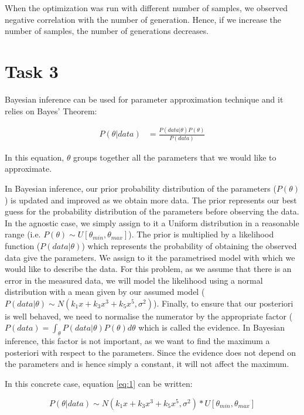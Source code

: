 \documentclass{article}
\begin{document}
    When the optimization was run with different number of samples, we observed negative correlation with the number of generation. Hence, if we increase the number of samples, the number of generations decreases.

    \section{Task 3}
    Bayesian inference can be used for parameter approximation technique and it relies on Bayes' Theorem:
        
    \begin{align}
        P(\theta | data) &= \frac{P(data | \theta) P(\theta)}{P(data)}
        \label{eq:1}
    \end{align}

    In this equation, $\theta$ groups together all the parameters that we would like to approximate.

    In Bayesian inference, our prior probability distribution of the parameters ($P(\theta)$) is updated and improved as we obtain more data.
    The prior represents our best guess for the probability distribution of the parameters before observing the data.
    In the agnostic case, we simply assign to it a Uniform distribution in a reasonable range (i.e. $P(\theta) \sim U[\theta_{min}, \theta_{max}]$).
    The prior is multiplied by a likelihood function ($P(data|\theta)$) which represents the probability of obtaining the observed data give the parameters.
    We assign to it the parametrised model with which we would like to describe the data. 
    For this problem, as we assume that there is an error in the measured data, we will model the likelihood using a normal distribution with a mean given by our assumed model ($P(data | \theta) \sim N(k_1 x + k_3 x^3 + k_5 x^5, \sigma^2)$).
    Finally, to ensure that our posteriori is well behaved, we need to normalise the numerator by the appropriate factor ($P(data) = \int_{\theta} P(data | \theta) P(\theta) d\theta$ which is called the evidence.
    In Bayesian inference, this factor is not important, as we want to find the maximum a posteriori with respect to the parameters. Since the evidence does not depend on the parameters and is hence simply a constant, it will not affect the maximum.


    In this concrete case, equation \ref{eq:1} can be written:

    \begin{equation}
        P(\theta | data) \sim N(k_1 x + k_3 x^3 + k_5 x^5, \sigma^2) * U[\theta_{min}, \theta_{max}]
    \end{equation}
\end{document}
